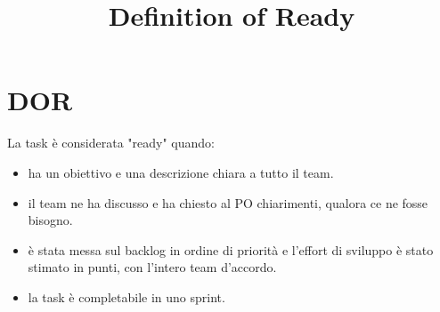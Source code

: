 \documentclass{article}
\title{Definition of Ready}
\author{}
\date{}
\begin{document}
\maketitle

\section*{DOR}
La task è considerata "ready" quando:
\begin{itemize}[leftmargin=*]
    \item ha un obiettivo e una descrizione chiara a tutto il team.
    \item il team ne ha discusso e ha chiesto al PO chiarimenti, qualora ce ne fosse bisogno.
    \item è stata messa sul backlog in ordine di priorità e l'effort di sviluppo è stato stimato in punti, con l'intero team d'accordo.
    \item la task è completabile in uno sprint.
\end{itemize}
\end{document}
